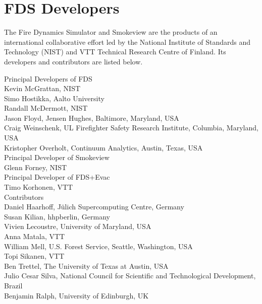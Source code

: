 \chapter{FDS Developers}

The Fire Dynamics Simulator and Smokeview are the products of an international collaborative effort led by
the National Institute of Standards and Technology (NIST) and VTT Technical Research Centre of Finland. Its developers and
contributors are listed below.

\vspace{0.3in}

\begin{flushleft}

Principal Developers of FDS  \\ [0.2in]

Kevin McGrattan, NIST \\
Simo Hostikka, Aalto University \\
Randall McDermott, NIST \\
Jason Floyd, Jensen Hughes, Baltimore, Maryland, USA \\
Craig Weinschenk, UL Firefighter Safety Research Institute, Columbia, Maryland, USA \\
Kristopher Overholt, Continuum Analytics, Austin, Texas, USA \\ [0.3in]

Principal Developer of Smokeview  \\ [0.2in]

Glenn Forney, NIST \\ [0.3in]

Principal Developer of FDS+Evac  \\ [0.2in]

Timo Korhonen, VTT \\ [0.3in]

Contributors \\ [0.2in]

Daniel Haarhoff, J\"ulich Supercomputing Centre, Germany \\
Susan Kilian, hhpberlin, Germany \\
Vivien Lecoustre, University of Maryland, USA \\
Anna Matala, VTT \\
William Mell, U.S. Forest Service, Seattle, Washington, USA \\
Topi Sikanen, VTT \\
Ben Trettel, The University of Texas at Austin, USA \\
Julio Cesar Silva, National Council for Scientific and Technological Development, Brazil \\
Benjamin Ralph, University of Edinburgh, UK

\end{flushleft}


